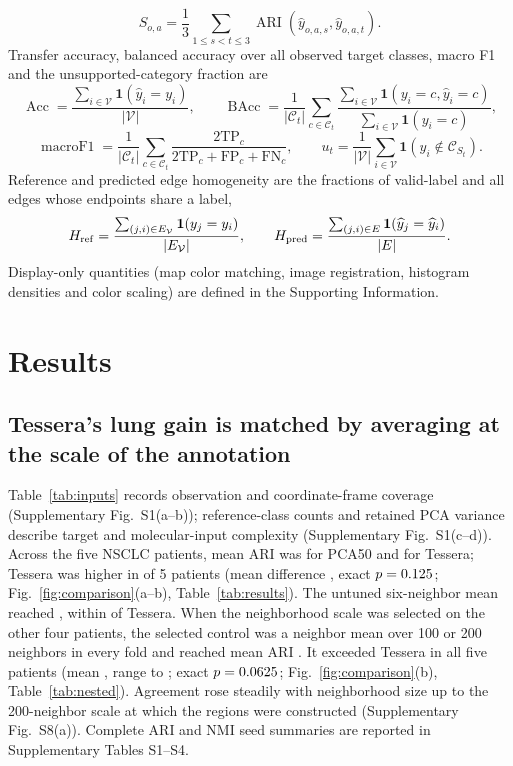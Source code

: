 \documentclass[11pt]{article}
\newcommand{\panelref}[2]{Fig.~\ref{#1}(#2)}
\newcommand{\suppanelref}[2]{Supplementary Fig.~#1(#2)}
\begin{document}
\begin{equation}
S_{o,a}=\frac13\sum_{1\leq s<t\leq3}\operatorname{ARI}(\widehat y_{o,a,s},\widehat y_{o,a,t}).\label{eq:stability}
\end{equation}
Transfer accuracy, balanced accuracy over all observed target classes, macro F1 and the unsupported-category fraction are
\begin{equation}
\operatorname{Acc}=\frac{\sum_{i\in\mathcal V}\mathbf1(\widehat y_i=y_i)}{|\mathcal V|},\qquad
\operatorname{BAcc}=\frac{1}{|\mathcal C_t|}\sum_{c\in\mathcal C_t}
\frac{\sum_{i\in\mathcal V}\mathbf1(y_i=c,\widehat y_i=c)}{\sum_{i\in\mathcal V}\mathbf1(y_i=c)},\label{eq:accuracy}
\end{equation}
\begin{equation}
\operatorname{macroF1}=\frac{1}{|\mathcal C_t|}\sum_{c\in\mathcal C_t}
\frac{2\mathrm{TP}_c}{2\mathrm{TP}_c+\mathrm{FP}_c+\mathrm{FN}_c},\qquad
u_t=\frac{1}{|\mathcal V|}\sum_{i\in\mathcal V}\mathbf1(y_i\notin\mathcal C_{S_t}).\label{eq:f1}
\end{equation}
Reference and predicted edge homogeneity are the fractions of valid-label and all edges whose endpoints share a label,
\begin{equation}
H_{\rm ref}=\frac{\sum_{(j,i)\in E_{\mathcal V}}\mathbf1(y_j=y_i)}{|E_{\mathcal V}|},\qquad
H_{\rm pred}=\frac{\sum_{(j,i)\in E}\mathbf1(\widehat y_j=\widehat y_i)}{|E|}.\label{eq:homogeneity}
\end{equation}
Display-only quantities (map color matching, image registration, histogram densities and color scaling) are defined in the Supporting Information.

\section{Results}
\subsection{Tessera's lung gain is matched by averaging at the scale of the annotation}
Table~\ref{tab:inputs} records observation and coordinate-frame coverage (\suppanelref{S1}{a--b}); reference-class counts and retained PCA variance describe target and molecular-input complexity (\suppanelref{S1}{c--d}). Across the five NSCLC patients, mean ARI was \NsclcPca{} for PCA50 and \NsclcFull{} for Tessera; Tessera was higher in \LungVsPcaPositive{} of 5 patients (mean difference \NsclcDelta{}, exact \(p=0.125{}\); \panelref{fig:comparison}{a--b}, Table~\ref{tab:results}). The untuned six-neighbor mean reached \NsclcMean{}, within \NsclcVsMean{} of Tessera. When the neighborhood scale was selected on the other four patients, the selected control was a neighbor mean over 100 or 200 neighbors in every fold and reached mean ARI \LungNestedControlMean{}. It exceeded Tessera in all five patients (mean \LungNestedDelta{}, range \LungNestedMin{} to \LungNestedMax{}; exact \(p=0.0625{}\); \panelref{fig:comparison}{b}, Table~\ref{tab:nested}). Agreement rose steadily with neighborhood size up to the 200-neighbor scale at which the regions were constructed (\suppanelref{S8}{a}). Complete ARI and NMI seed summaries are reported in Supplementary Tables S1--S4.
\end{document}
